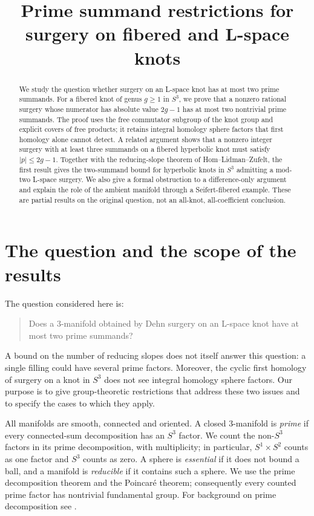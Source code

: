 \documentclass[11pt]{article}
\title{Prime summand restrictions for surgery on fibered and L-space knots}
\author{}
\date{}
\theoremstyle{remark}
\begin{document}
\maketitle

\begin{abstract}
We study the question whether surgery on an L-space knot has at most two prime summands. For a fibered knot of genus $g\geq1$ in $S^3$, we prove that a nonzero rational surgery whose numerator has absolute value $2g-1$ has at most two nontrivial prime summands. The proof uses the free commutator subgroup of the knot group and explicit covers of free products; it retains integral homology sphere factors that first homology alone cannot detect. A related argument shows that a nonzero integer surgery with at least three summands on a fibered hyperbolic knot must satisfy $|p|\leq2g-1$. Together with the reducing-slope theorem of Hom--Lidman--Zufelt, the first result gives the two-summand bound for hyperbolic knots in $S^3$ admitting a mod-two L-space surgery. We also give a formal obstruction to a difference-only argument and explain the role of the ambient manifold through a Seifert-fibered example. These are partial results on the original question, not an all-knot, all-coefficient conclusion.
\end{abstract}

\section{The question and the scope of the results}

The question considered here is:
\begin{quote}
Does a $3$-manifold obtained by Dehn surgery on an L-space knot have at most two prime summands?
\end{quote}
A bound on the number of reducing slopes does not itself answer this question: a single filling could have several prime factors. Moreover, the cyclic first homology of surgery on a knot in $S^3$ does not see integral homology sphere factors. Our purpose is to give group-theoretic restrictions that address these two issues and to specify the cases to which they apply.

All manifolds are smooth, connected and oriented. A closed $3$-manifold is \emph{prime} if every connected-sum decomposition has an $S^3$ factor. We count the non-$S^3$ factors in its prime decomposition, with multiplicity; in particular, $S^1\times S^2$ counts as one factor and $S^3$ counts as zero. A sphere is \emph{essential} if it does not bound a ball, and a manifold is \emph{reducible} if it contains such a sphere. We use the prime decomposition theorem and the Poincar\'e theorem; consequently every counted prime factor has nontrivial fundamental group. For background on prime decomposition see \cite[Section~1.1]{Hatcher}.
\end{document}
